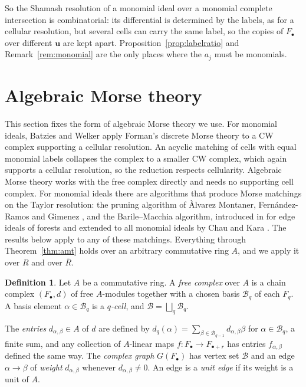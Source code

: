 \documentclass[12pt]{amsart}
\theoremstyle{plain}
\theoremstyle{definition}
\newtheorem{definition}[theorem]{Definition}
\newcommand{\F}{ {F_\bullet} }
\newcommand{\Rbar}{\overline{R}}
\newcommand{\B}{\mathcal{B}}
\begin{document}
So the Shamash resolution of a monomial ideal over a monomial complete intersection is combinatorial: its differential is determined by the labels, as for a cellular resolution, but several cells can carry the same label, so the copies of $\F$ over different $\boldsymbol{u}$ are kept apart. Proposition~\ref{prop:labelratio} and Remark~\ref{rem:monomial} are the only places where the $a_j$ must be monomials.

\section{Algebraic Morse theory}\label{sec:amt}

This section fixes the form of algebraic Morse theory we use. For monomial ideals, Batzies and Welker \cite{BatziesWelker} apply Forman's discrete Morse theory \cite{Forman} to a CW complex supporting a cellular resolution. An acyclic matching of cells with equal monomial labels collapses the complex to a smaller CW complex, which again supports a cellular resolution, so the reduction respects cellularity. Algebraic Morse theory \cite{JollenbeckWelker,Skoldberg} works with the free complex directly and needs no supporting cell complex. For monomial ideals there are algorithms that produce Morse matchings on the Taylor resolution: the pruning algorithm of \`Alvarez Montaner, Fern\'andez-Ramos and Gimenez \cite[Algorithm~3.1]{AlvarezFernandezGimenez}, and the Barile--Macchia algorithm, introduced in \cite{BarileMacchia} for edge ideals of forests and extended to all monomial ideals by Chau and Kara \cite[Algorithm~2.9]{ChauKara}. The results below apply to any of these matchings. Everything through Theorem~\ref{thm:amt} holds over an arbitrary commutative ring $A$, and we apply it over $R$ and over $\Rbar$.

\begin{definition}\label{def:based}
    Let $A$ be a commutative ring. A \emph{free complex} over $A$ is a chain complex $(\F, d)$ of free $A$-modules together with a chosen basis $\B_q$ of each $F_q$. A basis element $\alpha \in \B_q$ is a \emph{$q$-cell}, and $\B = \bigsqcup_q \B_q$.

    The \emph{entries} $d_{\alpha,\beta} \in A$ of $d$ are defined by $d_q(\alpha) = \sum_{\beta \in \B_{q-1}} d_{\alpha,\beta} \beta$ for $\alpha \in \B_q$, a finite sum, and any
    collection of $A$-linear maps $f \colon F_\bullet \to F_{\bullet+r}$ has entries $f_{\alpha,\beta}$ defined the same way. The \emph{complex graph} $G(\F)$ has vertex set $\B$ and an edge $\alpha \to \beta$ of \emph{weight} $d_{\alpha,\beta}$ whenever $d_{\alpha,\beta} \neq 0$. An edge is a \emph{unit edge} if its weight is a unit of $A$.
\end{definition}
\end{document}
